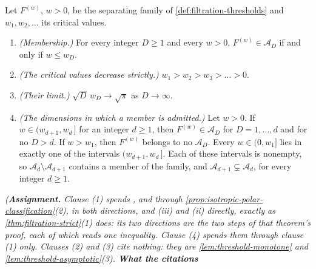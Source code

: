 \begin{theorem}
\label{thm:separating-family-critical-values}
\leanok
Let $F^{(w)}$, $w > 0$, be the separating family of \ref{def:filtration-thresholds} and
$w_1, w_2, \dots$ its critical values.
\begin{enumerate}
\item \emph{(Membership.)} For every integer $D \ge 1$ and every $w > 0$,
$F^{(w)} \in \mathcal{A}_D$ if and only if $w \le w_D$.
\item \emph{(The critical values decrease strictly.)} $w_1 > w_2 > w_3 > \dots > 0$.
\item \emph{(Their limit.)} $\sqrt D\,w_D \to \sqrt\pi$ as $D \to \infty$.
\item \emph{(The dimensions in which a member is admitted.)} Let $w > 0$. If
$w \in (w_{d+1}, w_d\,]$ for an integer $d \ge 1$, then $F^{(w)} \in \mathcal{A}_D$ for
$D = 1, \dots, d$ and for no $D > d$. If $w > w_1$, then $F^{(w)}$ belongs to no
$\mathcal{A}_D$. Every $w \in (0, w_1]$ lies in exactly one of the intervals
$(w_{d+1}, w_d\,]$. Each of these intervals is nonempty, so
$\mathcal{A}_d \setminus \mathcal{A}_{d+1}$ contains a member of the family, and
$\mathcal{A}_{d+1} \subsetneq \mathcal{A}_d$, for every integer $d \ge 1$.
\end{enumerate}
\statusA\quad{}\quad{}\quad{}\quad\emph{(\textbf{Assignment.} Clause
(1) spends ,  and
 through \ref{prop:isotropic-polar-classification}(2), in both directions, and
(iii) and (ii) directly, exactly as \ref{thm:filtration-strict}(1) does: its two
directions are the two steps of that theorem's proof, each of which reads one inequality.
Clause (4) spends them through clause (1) only. Clauses (2) and (3) cite nothing: they are
\ref{lem:threshold-monotone} and \ref{lem:threshold-asymptotic}(3). \textbf{What the citations
}}
\end{theorem}
